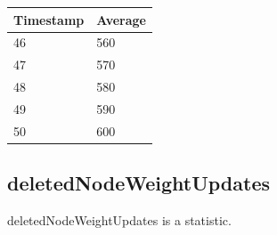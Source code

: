 \begin{tabular}{|l||l|}
\hline
	\textbf{Timestamp} & \textbf{Average} \\ \hline
	46 & 560 \\ \hline
	47 & 570 \\ \hline
	48 & 580 \\ \hline
	49 & 590 \\ \hline
	50 & 600 \\ \hline
\end{tabular}

\subsection{deletedNodeWeightUpdates}
deletedNodeWeightUpdates is a statistic.

%
%
